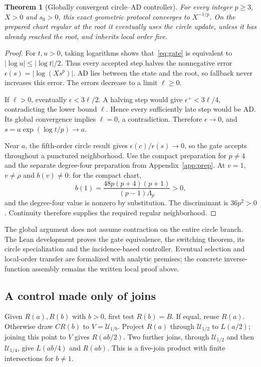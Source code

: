 \documentclass[11pt,a4paper]{article}
\newtheorem{theorem}{Theorem}[section]\newtheorem{proposition}[theorem]{Proposition}
\newcommand{\hub}[1]{\mathcal U_{#1}}
\begin{document}
\begin{theorem}[Globally convergent circle--AD controller]\label{thm:guard}
For every integer $p\ge3$, $X>0$ and $s_0>0$, this exact geometric protocol converges to $X^{-1/p}$. On the prepared chart regular at the root it eventually uses the circle update, unless it has already reached the root, and inherits local order five.
\end{theorem}
\begin{proof}
For $t,u>0$, taking logarithms shows that~\eqref{eq:gate} is equivalent to $|\log u|\le|\log t|/2$. Thus every accepted step halves the nonnegative error $\epsilon(s)=|\log(Xs^p)|$. AD lies between the state and the root, so fallback never increases this error. The errors decrease to a limit $\ell\ge0$.

If $\ell>0$, eventually $\epsilon<3\ell/2$. A halving step would give $\epsilon^+<3\ell/4$, contradicting the lower bound $\ell$. Hence every sufficiently late step would be AD. Its global convergence implies $\ell=0$, a contradiction. Therefore $\epsilon\to0$, and $s=a\exp(\log t/p)\to a$.

Near $a$, the fifth-order circle result gives $\epsilon(c)/\epsilon(s)\to0$, so the gate accepts throughout a punctured neighborhood. Use the compact preparation for $p\ne4$ and the separate degree-four preparation from Appendix~\ref{app:prep}. At $v=1$, $v\ne\rho$ and $b(v)\ne0$: for the compact chart,
\[
 b(1)=\frac{48p(p+4)(p+1)}{(p-1)\Lambda_p}>0,
\]
and the degree-four value is nonzero by substitution. The discriminant is $36p^2>0$. Continuity therefore supplies the required regular neighborhood.
\end{proof}
The global argument does not assume contraction on the entire circle branch. The Lean development proves the gate equivalence, the switching theorem, its circle specialization and the incidence-based controller. Eventual selection and local-order transfer are formalized with analytic premises; the concrete inverse-function assembly remains the written local proof above.

\subsection{A control made only of joins}
Given $R(a),R(b)$ with $b>0$, first test $R(b)=B$. If equal, reuse $R(a)$. Otherwise draw $CR(b)$ to $V=\hub{1/b}$. Project $R(a)$ through $\hub{1/2}$ to $L(a/2)$; joining this point to $V$ gives $R(ab/2)$. Two further joins, through $\hub{1/2}$ and then $\hub{1/4}$, give $L(ab/4)$ and $R(ab)$. This is a five-join product with finite intersections for $b\ne1$.
\end{document}
